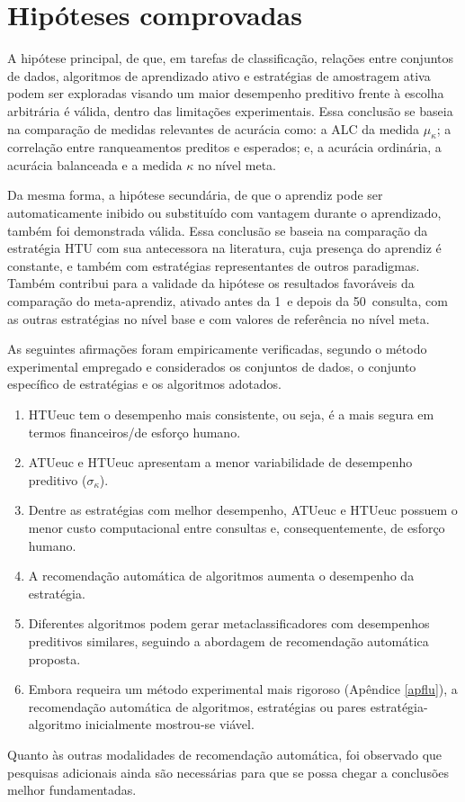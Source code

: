 \section{Hipóteses comprovadas}\label{conchipoteses}

A hipótese principal, de que, em tarefas de classificação, relações entre conjuntos de dados, algoritmos de aprendizado ativo e estratégias de amostragem ativa podem ser exploradas visando um maior desempenho preditivo frente à escolha arbitrária é válida, dentro das limitações experimentais.
Essa conclusão se baseia na comparação de medidas relevantes de acurácia como: a ALC da medida $\mu_\kappa$; a correlação entre ranqueamentos preditos e esperados; e, a acurácia ordinária, a acurácia balanceada e a medida $\kappa$ no nível meta.

Da mesma forma, a hipótese secundária, de que o aprendiz pode ser automaticamente inibido ou substituído com vantagem durante o aprendizado, também foi demonstrada válida.
Essa conclusão se baseia na comparação da estratégia HTU com sua antecessora na literatura, cuja presença do aprendiz é constante, e também com estratégias representantes de outros paradigmas.
Também contribui para a validade da hipótese os resultados favoráveis da comparação do meta-aprendiz, ativado antes da 1\textordfeminine~e depois da 50\textordfeminine~consulta, com as outras estratégias no nível base e com valores de referência no nível meta.

As seguintes afirmações foram empiricamente verificadas, segundo o método experimental empregado e considerados os conjuntos de dados, o conjunto específico de estratégias e os algoritmos adotados.
\begin{enumerate}
\item HTUeuc tem o desempenho mais consistente, ou seja, é a mais segura em termos financeiros/de esforço humano.
\item ATUeuc e HTUeuc apresentam a menor variabilidade de desempenho preditivo ($\sigma_\kappa$).
\item Dentre as estratégias com melhor desempenho, ATUeuc e HTUeuc possuem o menor custo computacional entre consultas e, consequentemente, de esforço humano.
\item A recomendação automática de algoritmos aumenta o desempenho da estratégia.
\item Diferentes algoritmos podem gerar metaclassificadores com desempenhos preditivos similares, seguindo a abordagem de recomendação automática proposta.
\item Embora requeira um método experimental mais rigoroso (Apêndice \ref{apflu}), a recomendação automática de algoritmos, estratégias ou pares estratégia-algoritmo inicialmente mostrou-se viável.
\end{enumerate}
Quanto às outras modalidades de recomendação automática, foi observado que pesquisas adicionais ainda são necessárias para que se possa chegar a conclusões melhor fundamentadas.

